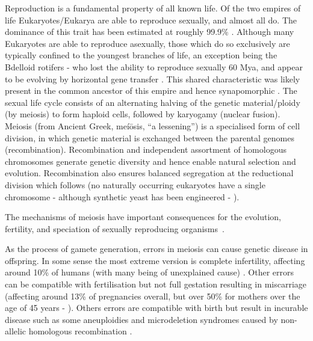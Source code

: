 Reproduction is a fundamental property of all known life.
Of the two empires of life Eukaryotes/Eukarya are able to reproduce sexually, and almost all do.
The dominance of this trait has been estimated at roughly 99.9\% \parencite{White1978Modes}.
Although many Eukaryotes are able to reproduce asexually, those which do so exclusively are typically confined to the youngest branches of life, an exception being the Bdelloid rotifers - who lost the ability to reproduce sexually 60 Mya, and appear to be evolving by horizontal gene transfer \parencite{Debortoli2016Genetic}.
This shared characteristic was likely present in the common ancestor of this empire and hence synapomorphic \parencite{Bernstein2013Evolutionary}.
The sexual life cycle consists of an alternating halving of the genetic material/ploidy (by meiosis) to form haploid cells, followed by karyogamy (nuclear fusion).
Meiosis (from Ancient Greek, meíōsis, “a lessening”) is a specialised form of cell division, in which genetic material is exchanged between the parental genomes (recombination).
Recombination and independent assortment of homologous chromosomes generate genetic diversity and hence enable natural selection and evolution.
Recombination also ensures balanced segregation at the reductional division which follows (no naturally occurring eukaryotes have a single chromosome - although synthetic yeast has been engineered - \cite{Shao2018Creating}).

The mechanisms of meiosis have important consequences for the evolution, fertility, and speciation of sexually reproducing organisms~\parencite{Davies2016Reengineering,Hassold2007Origin}. 


As the process of gamete generation, errors in meiosis can cause genetic disease in offspring.
In some sense the most extreme version is complete infertility, affecting around 10\% of humans (with many being of unexplained cause) \parencite{Datta2016Prevalence, Hamada2011Unexplained}.
Other errors can be compatible with fertilisation but not full gestation resulting in miscarriage (affecting around 13\% of pregnancies overall, but over 50\% for mothers over the age of 45 years - \cite{Magnus2019Role}).
Others errors are compatible with birth but result in incurable disease such as some aneuploidies \parencite{Hassold2007Origin} and microdeletion syndromes caused by non-allelic homologous recombination \parencite{Myers2008common}.


